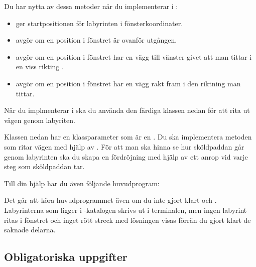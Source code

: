 
Du har nytta av dessa metoder när du implementerar  i :
\begin{itemize}[noitemsep]
  \item {} ger startpositionen för labyrinten i fönsterkoordinater.
  \item {} avgör om en position i fönstret är ovanför utgången.
  \item {} avgör om en position i fönstret har en vägg till vänster givet att man tittar i en viss rikting .
  \item {} avgör om en position i fönstret har en vägg rakt fram i den riktning man tittar.
\end{itemize}

När du implmenterar  i  ska du använda den färdiga klassen  nedan för att rita ut vägen genom labyriten.


Klassen  nedan har en klassparameter  som är en . Du ska implementera metoden  som ritar vägen med hjälp av . För att man ska hinna se hur sköldpaddan går genom labyrinten  ska du skapa en fördröjning med hjälp av ett anrop  vid varje steg som sköldpaddan tar.


Till din hjälp har du även följande huvudprogram:


Det går att köra huvudprogrammet även om du inte gjort klart  och . Labyrinterna som ligger i -katalogen skrivs ut i terminalen, men ingen labyrint ritas i fönstret och inget rött streck med lösningen visas förrän du gjort klart de saknade delarna.


\subsection{Obligatoriska uppgifter}


